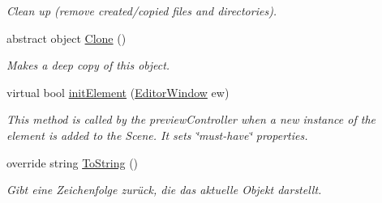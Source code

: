 \begin{DoxyCompactItemize}
\begin{DoxyCompactList}\small\item\em Clean up (remove created/copied files and directories). \end{DoxyCompactList}\item 
abstract object \hyperlink{class_a_rdev_kit_1_1_model_1_1_project_1_1_abstract_augmentation_a184416a3d47e35d58bb7f5bb6ce2e269}{Clone} ()
\begin{DoxyCompactList}\small\item\em Makes a deep copy of this object. \end{DoxyCompactList}\item 
virtual bool \hyperlink{class_a_rdev_kit_1_1_model_1_1_project_1_1_abstract_augmentation_a8b02a2eb775b8147e71575694ce8a38f}{init\-Element} (\hyperlink{class_a_rdev_kit_1_1_editor_window}{Editor\-Window} ew)
\begin{DoxyCompactList}\small\item\em This method is called by the preview\-Controller when a new instance of the element is added to the Scene. It sets \char`\"{}must-\/have\char`\"{} properties. \end{DoxyCompactList}\item 
override string \hyperlink{class_a_rdev_kit_1_1_model_1_1_project_1_1_abstract_augmentation_aa3badea1be1d6317e62e2dda390c2f34}{To\-String} ()
\begin{DoxyCompactList}\small\item\em Gibt eine Zeichenfolge zurück, die das aktuelle Objekt darstellt. \end{DoxyCompactList}\end{DoxyCompactItemize}
